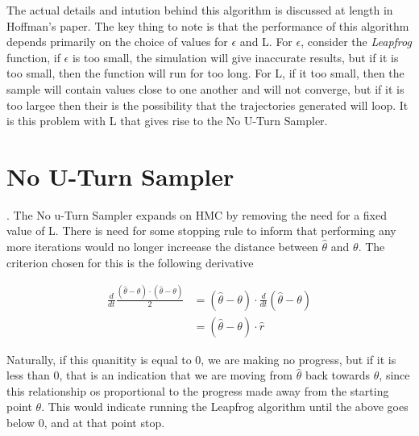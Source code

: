 The actual details and intution behind this algorithm is discussed at length in Hoffman's paper. The key thing to note is that the performance of this algorithm depends primarily on the choice of values for $\epsilon$ and L. For $\epsilon$, consider the \textit{Leapfrog} function, if $\epsilon$ is too small, the simulation will give inaccurate results, but if it is too small, then the function will run for too long. For L, if it too small, then the sample will contain values close to one another and will not converge, but if it is too largee then their is the possibility that the trajectories generated will loop. It is this problem with L that gives rise to the No U-Turn Sampler.

\section{No U-Turn Sampler}.
The No u-Turn Sampler expands on HMC by removing the need for a fixed value of L. There is need for some stopping rule to inform that performing any more iterations would no longer increease the distance between $\hat{\theta}$ and $\theta$. The criterion chosen for this is the following derivative

\begin{align*}
    \frac{d}{dt}\frac{(\hat{\theta}-\theta)\cdot (\hat{\theta}-\theta)}{2} &= (\hat{\theta}-\theta)\cdot \frac{d}{dt}(\hat{\theta}-\theta) \\
    &= (\hat{\theta}-\theta)\cdot \hat{r}
\end{align*}

Naturally, if this quanitity is equal to 0, we are making no progress, but if it is less than 0, that is an indication that we are moving from $\hat{\theta}$ back towards $\theta$, since this relationship os proportional to the progress made away from the starting point $\theta$. This would indicate running the Leapfrog algorithm until the above goes below 0, and at that point stop.
